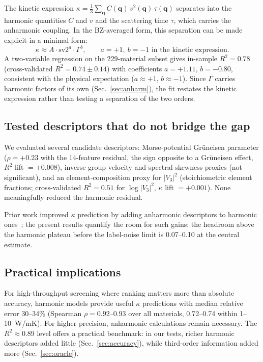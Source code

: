 \documentclass[aps,prm,reprint,onecolumn,groupedaddress]{revtex4-2}
\begin{document}
The kinetic expression $\kappa = \frac{1}{3} \sum_\mathbf{q} C(\mathbf{q})\, v^2(\mathbf{q})\, \tau(\mathbf{q})$ separates into the harmonic quantities $C$ and $v$ and the scattering time $\tau$, which carries the anharmonic coupling. In the BZ-averaged form, this separation can be made explicit in a minimal form:
\begin{equation}
\kappa \approx A \cdot \mathrm{sv2}^{a} \cdot \Gamma^{b}, \qquad a = +1,\ b = -1 \text{ in the kinetic expression.}
\end{equation}
A two-variable regression on the 229-material subset gives in-sample $R^2 = 0.78$ (cross-validated $R^2 = 0.74 \pm 0.14$) with coefficients $a = +1.11$, $b = -0.80$, consistent with the physical expectation ($a \approx +1$, $b \approx -1$). Since $\Gamma$ carries harmonic factors of its own (Sec.~\ref{sec:anharm}), the fit restates the kinetic expression rather than testing a separation of the two orders.

\subsection{Tested descriptors that do not bridge the gap}

We evaluated several candidate descriptors: Morse-potential Gr\"uneisen parameter ($\rho = +0.23$ with the 14-feature residual, the sign opposite to a Gr\"uneisen effect, $R^2$ lift $= +0.008$), inverse group velocity and spectral skewness proxies (not significant), and an element-composition proxy for $|V_3|^2$ (stoichiometric element fractions; cross-validated $R^2 = 0.51$ for $\log|V_3|^2$, $\kappa$ lift $= +0.001$). None meaningfully reduced the harmonic residual.

Prior work improved $\kappa$ prediction by adding anharmonic descriptors to harmonic ones~\cite{carrete2014,juneja2019,purcell2023}; the present results quantify the room for such gains: the headroom above the harmonic plateau before the label-noise limit is 0.07--0.10 at the central estimate.

\subsection{Practical implications}

For high-throughput screening where ranking matters more than absolute accuracy, harmonic models provide useful $\kappa$ predictions with median relative error 30--34\% (Spearman $\rho = 0.92$--$0.93$ over all materials, 0.72--0.74 within 1--10~W/mK). For higher precision, anharmonic calculations remain necessary. The $R^2 \approx 0.89$ level offers a practical benchmark: in our tests, richer harmonic descriptors added little (Sec.~\ref{sec:accuracy}), while third-order information added more (Sec.~\ref{sec:oracle}).
\end{document}
